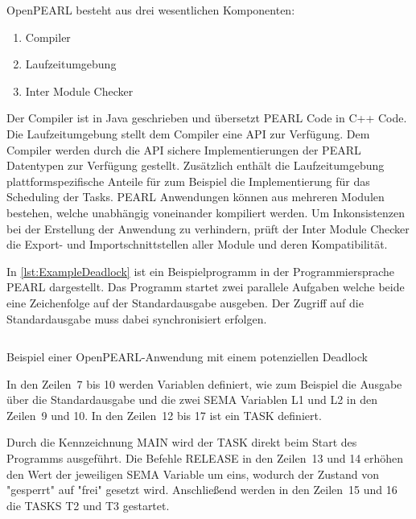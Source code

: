 OpenPEARL besteht aus drei wesentlichen
Komponenten:\autocite{OpenPEARL_Structure}
\begin{enumerate}
  \item Compiler
  \item Laufzeitumgebung
  \item Inter Module Checker
\end{enumerate}
Der Compiler ist in Java geschrieben und übersetzt PEARL Code in C++ Code. Die
Laufzeitumgebung stellt dem Compiler eine API zur Verfügung. Dem Compiler werden
durch die API sichere Implementierungen der PEARL Datentypen zur Verfügung
gestellt. Zusätzlich enthält die Laufzeitumgebung plattformspezifische Anteile
für zum Beispiel die Implementierung für das Scheduling der Tasks. PEARL
Anwendungen können aus mehreren Modulen bestehen, welche unabhängig voneinander
kompiliert werden. Um Inkonsistenzen bei der Erstellung der Anwendung zu
verhindern, prüft der Inter Module Checker die Export- und Importschnittstellen
aller Module und deren Kompatibilität.\autocite{OpenPEARL_Structure}

In \cref{lst:ExampleDeadlock} ist ein Beispielprogramm in der Programmiersprache
PEARL dargestellt. Das Programm startet zwei parallele Aufgaben welche beide
eine Zeichenfolge auf der Standardausgabe ausgeben. Der Zugriff auf die
Standardausgabe muss dabei synchronisiert erfolgen.
\begin{listing}[ht]
  \inputminted[frame=lines,linenos]{vim}{./Examples/Example_Deadlock.prl}
  \caption{Beispiel einer OpenPEARL-Anwendung mit einem potenziellen Deadlock}
  \label{lst:ExampleDeadlock}   
\end{listing} 
In den Zeilen~7 bis 10 werden Variablen definiert, wie zum Beispiel die Ausgabe
über die Standardausgabe und die zwei \textrm{SEMA} Variablen \textrm{L1} und
\textrm{L2} in den Zeilen~9 und 10. In den Zeilen~12 bis 17 ist ein \textrm{TASK}
definiert.

Durch die Kennzeichnung \textrm{MAIN} wird der \textrm{TASK} direkt beim Start
des Programms ausgeführt\autocite[vgl.][28]{PEARL}. Die Befehle \textrm{RELEASE}
in den Zeilen~13 und 14 erhöhen den Wert der jeweiligen \textrm{SEMA} Variable
um eins, wodurch der Zustand von "gesperrt" auf "frei" gesetzt wird.
Anschließend werden in den Zeilen~15 und 16 die \textrm{TASKS} \textrm{T2} und
\textrm{T3} gestartet.

